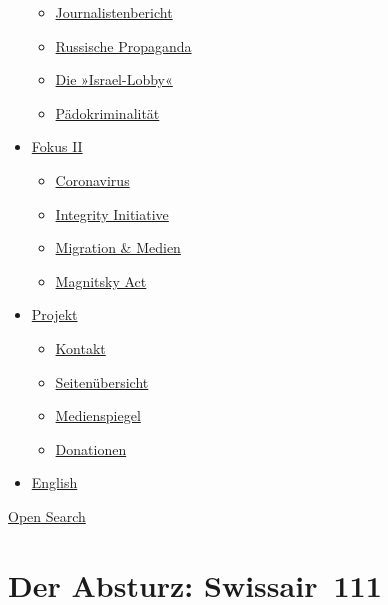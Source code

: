 \begin{itemize}
  \begin{itemize}
  \tightlist
  \item
    \href{https://swprs.org/bericht-eines-journalisten/}{Journalistenbericht}
  \item
    \href{https://swprs.org/russische-propaganda/}{Russische Propaganda}
  \item
    \href{https://swprs.org/die-israel-lobby-fakten-und-mythen/}{Die
    »Israel-Lobby«}
  \item
    \href{https://swprs.org/geopolitik-und-paedokriminalitaet/}{Pädokriminalität}
  \end{itemize}
\item
  \href{https://swprs.org/migration-und-medien/}{Fokus II}

  \begin{itemize}
  \tightlist
  \item
    \href{https://swprs.org/covid-19-hinweis-ii/}{Coronavirus}
  \item
    \href{https://swprs.org/die-integrity-initiative/}{Integrity
    Initiative}
  \item
    \href{https://swprs.org/migration-und-medien/}{Migration \& Medien}
  \item
    \href{https://swprs.org/der-fall-magnitsky/}{Magnitsky Act}
  \end{itemize}
\item
  \href{https://swprs.org/kontakt/}{Projekt}

  \begin{itemize}
  \tightlist
  \item
    \href{https://swprs.org/kontakt/}{Kontakt}
  \item
    \href{https://swprs.org/uebersicht/}{Seitenübersicht}
  \item
    \href{https://swprs.org/medienspiegel/}{Medienspiegel}
  \item
    \href{https://swprs.org/donationen/}{Donationen}
  \end{itemize}
\item
  \href{https://swprs.org/contact/}{English}
\end{itemize}

\protect\hyperlink{}{Open Search}

\hypertarget{der-absturz-swissair-111}{%
\section{Der Absturz: Swissair~111}\label{der-absturz-swissair-111}}

